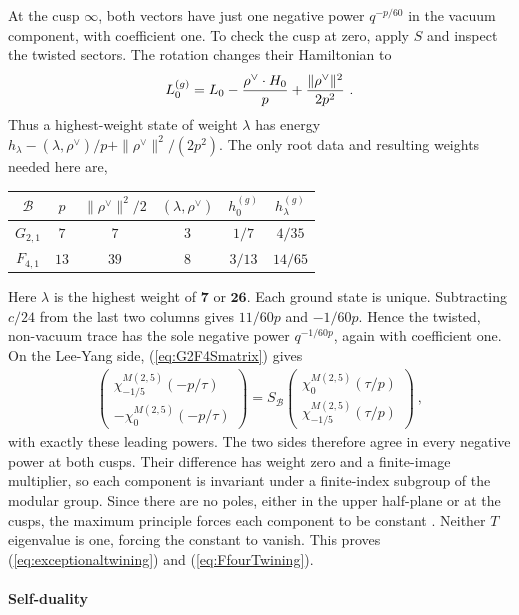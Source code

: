 \documentclass[12pt]{article}
\numberwithin{equation}{section}
\newcommand{\bea}{\begin{eqnarray}}
\newcommand{\eea}{\end{eqnarray}}
\theoremstyle{remark}
\begin{document}
At the cusp $\infty$, both vectors have just one negative power $q^{-p/60}$ in the vacuum component, with coefficient one. To check the cusp at zero, apply $S$ and inspect the twisted sectors. The rotation changes their Hamiltonian to 
\bea
L_0^{(g)}=L_0-{\rho^\vee\cdot H_0\over p}+{\|\rho^\vee\|^2\over2p^2}~.
\eea
Thus a highest-weight state of weight $\lambda$ has energy $h_\lambda-(\lambda,\rho^\vee)/p+\|\rho^\vee\|^2/(2p^2)$. The only root data and resulting weights needed here are,
\begin{center}
\begin{tabular}{c c c c c c}
\toprule
$\mathcal B$ & $p$ & $\|\rho^\vee\|^2/2$ & $(\lambda,\rho^\vee)$ & $h^{(g)}_0$ & $h^{(g)}_\lambda$\\
\midrule
$G_{2,1}$ & $7$ & $7$ & $3$ & $1/7$ & $4/35$\\
$F_{4,1}$ & $13$ & $39$ & $8$ & $3/13$ & $14/65$\\
\bottomrule
\end{tabular}
\end{center}
Here $\lambda$ is the highest weight of $\mathbf7$ or $\mathbf{26}$. Each ground state is unique. 
Subtracting $c/24$ from the last two columns gives $11/60p$ and $-1/60p$. Hence the twisted, non-vacuum trace has the sole negative power $q^{-1/60p}$, again with coefficient one. On the Lee-Yang side, (\ref{eq:G2F4Smatrix}) gives
\bea
\begin{pmatrix}\chi^{M(2,5)}_{-1/5}(-p/\tau)\\-\chi^{M(2,5)}_0(-p/\tau)\end{pmatrix}=S_{\mathcal B}\begin{pmatrix}\chi^{M(2,5)}_0(\tau/p)\\\chi^{M(2,5)}_{-1/5}(\tau/p)\end{pmatrix}~,
\eea
with exactly these leading powers. The two sides therefore agree in every negative power at both cusps. Their difference has weight zero and a finite-image multiplier, so each component is invariant under a finite-index subgroup of the modular group. Since there are no poles, either in the upper half-plane or at the cusps, the maximum principle forces each component to be constant \cite{DHoker:2024xor}. Neither $T$ eigenvalue is one, forcing the constant to vanish. This proves (\ref{eq:exceptionaltwining}) and (\ref{eq:FfourTwining}).

\paragraph{Self-duality}
\end{document}

